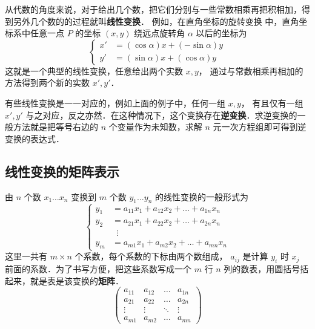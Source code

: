 

从代数的角度来说，对于给出几个数，把它们分别与一些常数相乘再把积相加，得到另外几个数的的过程就叫\textbf{线性变换}． 例如，在直角坐标的旋转变换%
中，直角坐标系中任意一点 $P$ 的坐标 $( {x,y} )$ 绕远点旋转角 $\alpha $ 以后的坐标为
\begin{equation}\label{LTrans_eq1}
\left\{\begin{aligned}
x' &= \left( {\cos \alpha } \right)x + \left( { - \sin \alpha } \right)y\\
y' &= \left( {\sin \alpha } \right)x + \left( {\cos \alpha } \right)y
\end{aligned}\right.\end{equation}
这就是一个典型的线性变换，任意给出两个实数 $x,y$， 通过与常数相乘再相加的方法得到两个新的实数  $x',y'$． 

有些线性变换是一一对应的，例如上面的例子中，任何一组 $x,y$， 有且仅有一组 $x',y'$ 与之对应，反之亦然．在这种情况下，这个变换存在\textbf{逆变换}．求逆变换的一般方法就是把等号右边的 $n$ 个变量作为未知数，求解 $n$ 元一次方程组即可得到逆变换的表达式．


\subsection{线性变换的矩阵表示}

由 $n$ 个数 ${x_1} \ldots {x_n}$ 变换到 $m$ 个数 ${y_1} \ldots {y_n}$ 的线性变换的一般形式为
\begin{equation}
\left\{ \begin{aligned}
{y_1} &= {a_{11}}{x_1} + {a_{12}}{x_2} + \ldots + {a_{1n}}{x_n}\\
{y_2} &= {a_{21}}{x_1} + {a_{22}}{x_2} + \ldots + {a_{2n}}{x_n}\\
&\;\;\vdots \\
{y_m} &= {a_{m1}}{x_1} + {a_{m2}}{x_2} + \ldots + {a_{mn}}{x_n}
\end{aligned} \right. 
\end{equation} 
这里一共有 $m \times n$ 个系数，每个系数的下标由两个数组成， ${a_{ij}}$ 是计算 ${y_i}$ 时 ${x_j}$ 前面的系数．为了书写方便，把这些系数写成一个 $m$ 行 $n$ 列的数表，用圆括号括起来，就是表是该变换的\textbf{矩阵}．
\begin{equation}
\left( {\begin{array}{*{20}{c}}
{{a_{11}}}&{{a_{12}}}& \ldots &{{a_{1n}}}\\
{{a_{21}}}&{{a_{22}}}& \ldots &{{a_{2n}}}\\
 \vdots & \vdots & \ddots & \vdots \\
{{a_{m1}}}&{{a_{m2}}}& \ldots &{{a_{mn}}}
\end{array}} \right)
\end{equation} 
